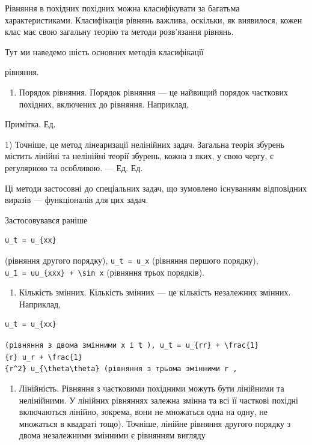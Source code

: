 \documentclass[
  ukrainian,
]{article}
\providecommand{\tightlist}{%
  \setlength{\itemsep}{0pt}\setlength{\parskip}{0pt}}
\begin{document}
Рівняння в похідних похідних можна класифікувати за багатьма
характеристиками. Класифікація рівнянь важлива, оскільки, як виявилося,
кожен клас має свою загальну теорію та методи розв'язання рівнянь.

Тут ми наведемо шість основних методів класифікації

рівняння.

\begin{enumerate}
\def\labelenumi{\arabic{enumi}.}
\tightlist
\item
  Порядок рівняння. Порядок рівняння --- це найвищий порядок часткових
  похідних, включених до рівняння. Наприклад,
\end{enumerate}

Примітка. Ед.

1) Точніше, це метод лінеаризації нелінійних задач. Загальна теорія
збурень містить лінійні та нелінійні теорії збурень, кожна з яких, у
свою чергу, є регулярною та особливою. --- Ед. Ед.

Ці методи застосовні до спеціальних задач, що зумовлено існуванням
відповідних виразів --- функціоналів для цих задач.

Застосовувався раніше

\begin{verbatim}
u_t = u_{xx}
\end{verbatim}

(рівняння другого порядку), \texttt{u\_t\ =\ u\_x} (рівняння першого
порядку), \texttt{u\_1\ =\ uu\_\{xxx\}\ +\ \textbackslash{}sin\ x}
(рівняння трьох порядків).

\begin{enumerate}
\def\labelenumi{\arabic{enumi}.}
\setcounter{enumi}{1}
\tightlist
\item
  Кількість змінних. Кількість змінних --- це кількість незалежних
  змінних. Наприклад,
\end{enumerate}

\begin{verbatim}
u_t = u_{xx}
\end{verbatim}

\texttt{(рівняння\ з\ двома\ змінними\ \textquotesingle{}x\textquotesingle{}\ і\ \textquotesingle{}t\textquotesingle{}\ ),\ \textquotesingle{}u\_t\ =\ u\_\{rr\}\ +\ \textbackslash{}frac\{1\}\{r\}\ u\_r\ +\ \textbackslash{}frac\{1\}\{r\^{}2\}\ u\_\{\textbackslash{}theta\textbackslash{}theta\}\textquotesingle{}\ (рівняння\ з\ трьома\ змінними\ \textquotesingle{}r\textquotesingle{}\ ,}

\begin{enumerate}
\def\labelenumi{\arabic{enumi}.}
\setcounter{enumi}{2}
\tightlist
\item
  Лінійність. Рівняння з частковими похідними можуть бути лінійними та
  нелінійними. У лінійних рівняннях залежна змінна та всі її часткові
  похідні включаються лінійно, зокрема, вони не множаться одна на одну,
  не множаться в квадраті тощо). Точніше, лінійне рівняння другого
  порядку з двома незалежними змінними є рівнянням вигляду
\end{enumerate}
\end{document}
